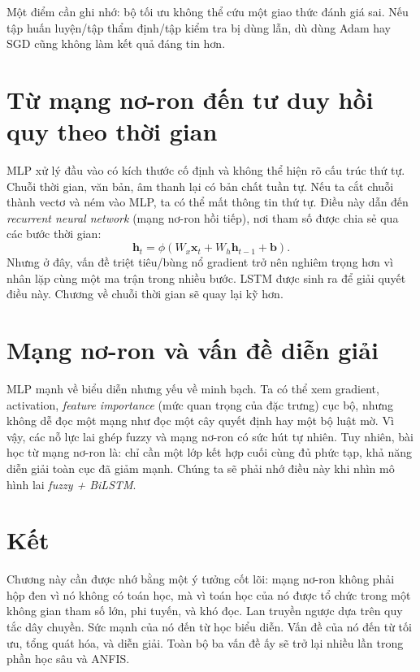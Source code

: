 Một điểm cần ghi nhớ: bộ tối ưu không thể cứu một giao thức đánh giá sai. Nếu tập huấn luyện/tập thẩm định/tập kiểm tra bị dùng lẫn, dù dùng Adam hay SGD cũng không làm kết quả đáng tin hơn.

\section{Từ mạng nơ-ron đến tư duy hồi quy theo thời gian}

MLP xử lý đầu vào có kích thước cố định và không thể hiện rõ cấu trúc thứ tự. Chuỗi thời gian, văn bản, âm thanh lại có bản chất tuần tự. Nếu ta cắt chuỗi thành vectơ và ném vào MLP, ta có thể mất thông tin thứ tự. Điều này dẫn đến \emph{recurrent neural network} (mạng nơ-ron hồi tiếp), nơi tham số được chia sẻ qua các bước thời gian:
\[
\bm{h}_t = \phi(W_x \bm{x}_t + W_h \bm{h}_{t-1} + \bm{b}).
\]
Nhưng ở đây, vấn đề triệt tiêu/bùng nổ gradient trở nên nghiêm trọng hơn vì nhân lặp cùng một ma trận trong nhiều bước. LSTM được sinh ra để giải quyết điều này. Chương về chuỗi thời gian sẽ quay lại kỹ hơn.

\section{Mạng nơ-ron và vấn đề diễn giải}

MLP mạnh về biểu diễn nhưng yếu về minh bạch. Ta có thể xem gradient, activation, \emph{feature importance} (mức quan trọng của đặc trưng) cục bộ, nhưng không dễ đọc một mạng như đọc một cây quyết định hay một bộ luật mờ. Vì vậy, các nỗ lực lai ghép fuzzy và mạng nơ-ron có sức hút tự nhiên. Tuy nhiên, bài học từ mạng nơ-ron là: chỉ cần một lớp kết hợp cuối cùng đủ phức tạp, khả năng diễn giải toàn cục đã giảm mạnh. Chúng ta sẽ phải nhớ điều này khi nhìn mô hình lai \emph{fuzzy + BiLSTM}.

\section{Kết}

Chương này cần được nhớ bằng một ý tưởng cốt lõi: mạng nơ-ron không phải hộp đen vì nó không có toán học, mà vì toán học của nó được tổ chức trong một không gian tham số lớn, phi tuyến, và khó đọc. Lan truyền ngược dựa trên quy tắc dây chuyền. Sức mạnh của nó đến từ học biểu diễn. Vấn đề của nó đến từ tối ưu, tổng quát hóa, và diễn giải. Toàn bộ ba vấn đề ấy sẽ trở lại nhiều lần trong phần học sâu và ANFIS.
